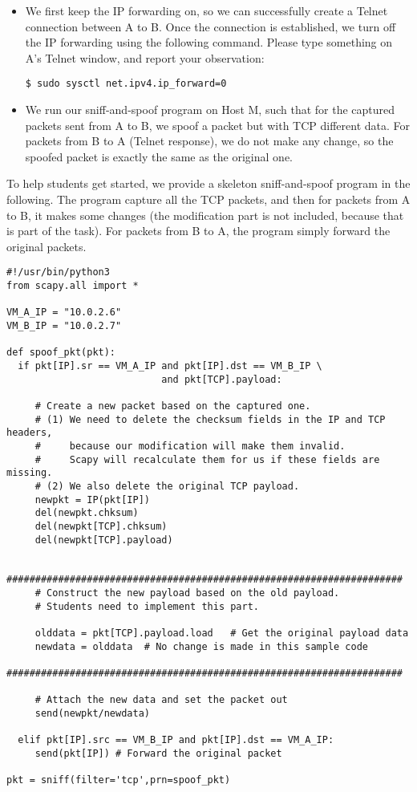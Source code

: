 \begin{itemize}

\item We first keep the IP forwarding on, so we can successfully create a Telnet connection
between A to B. Once the connection is established, we turn off the IP forwarding using the
following command. Please type something on A's Telnet window, and report your observation: 

\begin{lstlisting}
$ sudo sysctl net.ipv4.ip_forward=0
\end{lstlisting}

\item We run our sniff-and-spoof program on Host M, such that for the captured packets sent
from A to B,  we spoof a packet but with TCP different data. For packets from B to A (Telnet
response), we do not make any change, so the spoofed packet is exactly the same as the original
one. 
\end{itemize} 

To help students get started, we provide a skeleton sniff-and-spoof
program in the following. The program capture all the TCP packets, and 
then for packets from A to B, it makes some changes (the modification
part is not included, because that is part of the task). For packets from
B to A, the program simply forward the original packets. 

\begin{lstlisting}
#!/usr/bin/python3
from scapy.all import *

VM_A_IP = "10.0.2.6"
VM_B_IP = "10.0.2.7"

def spoof_pkt(pkt):
  if pkt[IP].sr == VM_A_IP and pkt[IP].dst == VM_B_IP \
                           and pkt[TCP].payload:

     # Create a new packet based on the captured one.
     # (1) We need to delete the checksum fields in the IP and TCP headers, 
     #     because our modification will make them invalid.
     #     Scapy will recalculate them for us if these fields are missing. 
     # (2) We also delete the original TCP payload.
     newpkt = IP(pkt[IP])
     del(newpkt.chksum)  
     del(newpkt[TCP].chksum) 
     del(newpkt[TCP].payload) 

     #####################################################################
     # Construct the new payload based on the old payload.
     # Students need to implement this part.

     olddata = pkt[TCP].payload.load   # Get the original payload data 
     newdata = olddata  # No change is made in this sample code
     #####################################################################

     # Attach the new data and set the packet out
     send(newpkt/newdata)

  elif pkt[IP].src == VM_B_IP and pkt[IP].dst == VM_A_IP:
     send(pkt[IP]) # Forward the original packet

pkt = sniff(filter='tcp',prn=spoof_pkt)
\end{lstlisting}


